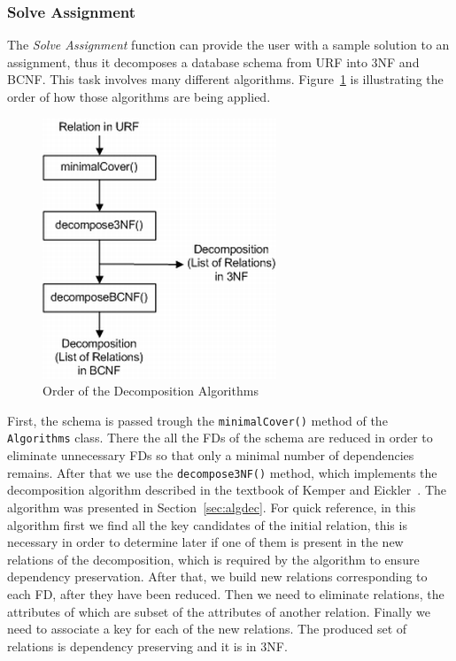 \subsubsection{Solve Assignment}  
The \textit{Solve Assignment} function can provide the user with a sample solution
to an assignment, thus it decomposes a database schema from URF into 3NF and BCNF. This
task involves many different algorithms. Figure~\ref{fig:orderdecomposition} is 
illustrating the order of how those algorithms are being applied.

\begin{figure}[h]
	\begin{center}
		\includegraphics[scale=0.6]{./img/decomposition1a.png}
		\caption{Order of the Decomposition Algorithms}
		\label{fig:orderdecomposition}
	\end{center}
\end{figure}

First, the schema is passed trough the
\verb=minimalCover()= method of the \verb=Algorithms= class. There the all the
FDs of the schema are reduced in order to eliminate unnecessary FDs so that only 
a minimal number of dependencies remains. After that we use the \verb=decompose3NF()=
method, which implements the decomposition algorithm described in the textbook of 
Kemper and Eickler~\cite{bdb2}. The algorithm was presented in Section~\ref{sec:algdec}.
For quick reference, in this algorithm first we find all the key candidates of
the initial relation, this is necessary in order to determine later if one of them
is present in the new relations of the decomposition, which is required by the algorithm
to ensure dependency preservation. After that, we build new relations corresponding
to each FD, after they have been reduced. Then we need to eliminate relations, the attributes
of which are subset of the attributes of another relation. Finally we need to associate a
key for each of the new relations. The produced set of relations is dependency preserving and
it is in 3NF.

